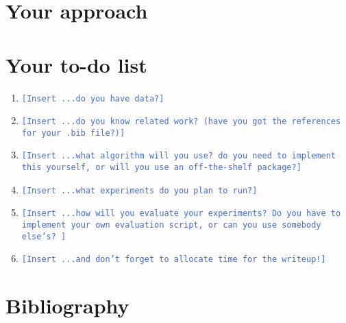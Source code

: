 \documentclass[11pt,A4]{article}
\newcommand{\blue}[1]{\textcolor{RoyalBlue}{#1}}
\newcommand{\fillme}[1]{\blue{\texttt{[Insert #1]}}}
\newcommand{\instructions}[1]{\blue{\textit{#1}}}
\renewcommand{\instructions}[1]{}
\begin{document}
\section*{Your approach} 
\instructions{Describe how you want to tackle this task}

\section*{Your to-do list}
\instructions{Get started by making a to-do list. Set yourself deadlines. Here are a few
  items that might appear on your to-do list}
\begin{enumerate}
\item \fillme{...do you have data?}
\item \fillme{...do you know related work? (have you got the
    references  for your .bib file?)}
\item \fillme{...what algorithm will you use? do you need to implement
    this yourself, or will you use an off-the-shelf package?} 
\item \fillme{...what experiments do you plan to run?}
  \item \fillme{...how will you evaluate your experiments? Do you have
    to implement your own evaluation script, or can you use somebody
    else's? }
\item \fillme{...and don't forget to allocate time for the writeup!} 
\end{enumerate}

\section*{Bibliography}
\instructions{Your references for the background section, should go in your own .bib file. You then need to run {\tt bibtex}.\footnote{You may want to look at \url{http://www.bibtex.org/Using/}}.  If you call your bibliography {\tt mybib.bib} and put it in the same directory as this {\tt .tex} file, add {\tt$\backslash$bibliography\{mybib\}} before {\tt$\backslash$end\{document\}}
}


\end{document}
